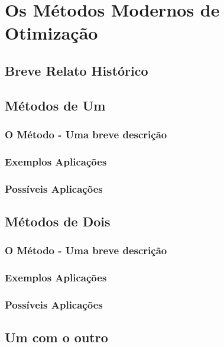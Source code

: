 

\chapter{\Large{Os Métodos Modernos de Otimização}} \label{chp:3}


\section{Breve Relato Histórico}

\hspace{0.8cm}

\section{{Métodos de Um}}

\hspace{0.8cm}

\subsection{O Método - Uma breve descrição}

\subsection{Exemplos Aplicações}

\subsection{Possíveis Aplicações}


\section{{Métodos de Dois}}

\hspace{0.8cm}

\subsection{O Método - Uma breve descrição}

\subsection{Exemplos Aplicações}

\subsection{Possíveis Aplicações}

\textcolor[rgb]{1,0,0}{\section{{Um com o outro}}}
